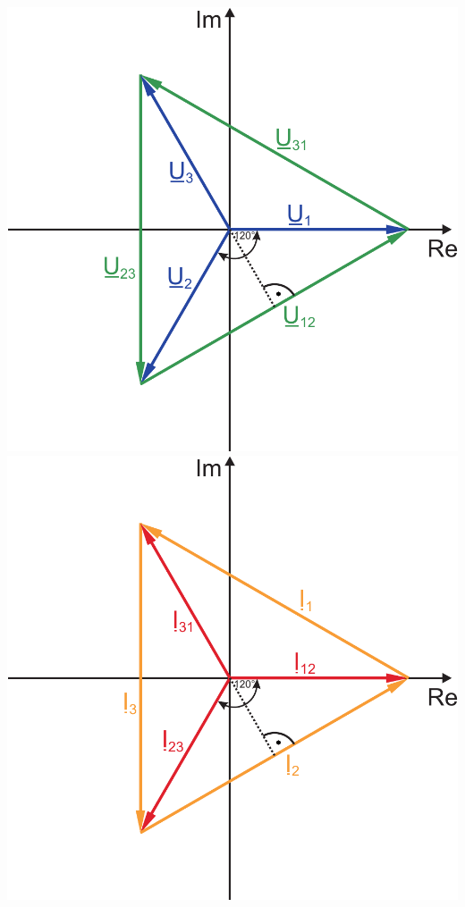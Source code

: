 \documentclass[a4paper,twocolumn,10pt]{article}
\begin{document}
\begin{center}
\includegraphics[width=0.48\columnwidth]{Grafiken/Drehstrom_Zeigerdiagramm}
\includegraphics[width=0.48\columnwidth]{Grafiken/Drehstrom_Zeigerdiagramm_Strom}
\end{center}
\end{document}

